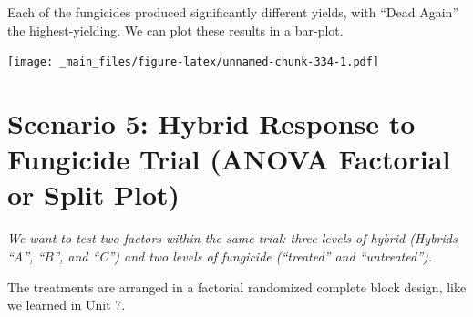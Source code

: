 \documentclass[
]{book}
\newenvironment{Shaded}{\begin{snugshade}}{\end{snugshade}}
\newcommand{\AttributeTok}[1]{\textcolor[rgb]{0.77,0.63,0.00}{#1}}
\newcommand{\FunctionTok}[1]{\textcolor[rgb]{0.00,0.00,0.00}{#1}}
\newcommand{\NormalTok}[1]{#1}
\newcommand{\OtherTok}[1]{\textcolor[rgb]{0.56,0.35,0.01}{#1}}
\newcommand{\SpecialCharTok}[1]{\textcolor[rgb]{0.00,0.00,0.00}{#1}}
\newcommand{\StringTok}[1]{\textcolor[rgb]{0.31,0.60,0.02}{#1}}
\begin{document}
Each of the fungicides produced significantly different yields, with ``Dead Again'' the highest-yielding. We can plot these results in a bar-plot.

\begin{Shaded}
\end{Shaded}

\texttt{[image: \_main\_files/figure-latex/unnamed-chunk-334-1.pdf]}

\hypertarget{scenario-5-hybrid-response-to-fungicide-trial-anova-factorial-or-split-plot}{%
\section{Scenario 5: Hybrid Response to Fungicide Trial (ANOVA Factorial or Split Plot)}\label{scenario-5-hybrid-response-to-fungicide-trial-anova-factorial-or-split-plot}}

\emph{We want to test two factors within the same trial: three levels of hybrid (Hybrids ``A'', ``B'', and ``C'') and two levels of fungicide (``treated'' and ``untreated'').}

The treatments are arranged in a factorial randomized complete block design, like we learned in Unit 7.
\end{document}
